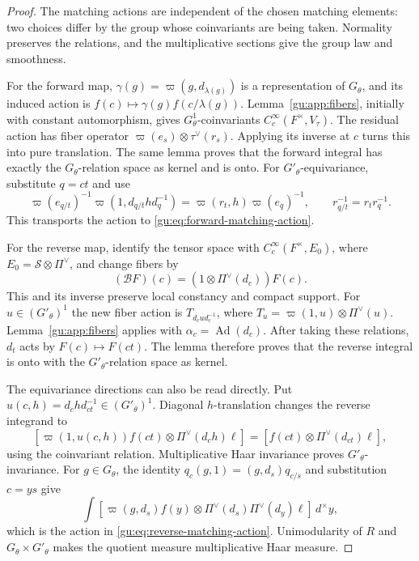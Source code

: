 \begin{proof}
The matching actions are independent of the chosen matching elements:
two choices differ by the group whose coinvariants are being taken.
Normality preserves the relations, and the multiplicative sections give
the group law and smoothness.

For the forward map, $\gamma(g)=\varpi(g,d_{\lambda(g)})$ is a
representation of $G_\theta$, and its induced action is
$f(c)\mapsto\gamma(g)f(c/\lambda(g))$. Lemma~\ref{gu:app:fibers}, initially
with constant automorphism, gives $G_\theta^1$-coinvariants
$C_c^\infty(F^\times,V_\tau)$. The residual action has fiber operator
$\varpi(e_s)\otimes\tau^\vee(r_s)$. Applying its inverse at $c$
turns this into pure translation. The same lemma proves that the
forward integral has exactly the $G_\theta$-relation space as kernel and is
onto. For $G'_\theta$-equivariance, substitute $q=ct$ and use
\[
 \varpi(e_{q/t})^{-1}\varpi(1,d_{q/t}hd_q^{-1})
 =\varpi(r_t,h)\varpi(e_q)^{-1},\qquad
 r_{q/t}^{-1}=r_t r_q^{-1}.
\]
This transports the action to \eqref{gu:eq:forward-matching-action}.

For the reverse map, identify the tensor space with
$C_c^\infty(F^\times,E_0)$, where $E_0=\mathscr S\otimes\Pi^\vee$,
and change fibers by
\begin{equation}\label{gu:asm:fiber-change}
 (\mathcal BF)(c)=(1\otimes\Pi^\vee(d_c))F(c).
\end{equation}
This and its inverse preserve local constancy and compact support.
For $u\in (G'_\theta)^1$ the new fiber action is
$T_{d_cud_c^{-1}}$, where $T_u=\varpi(1,u)\otimes\Pi^\vee(u)$.
Lemma~\ref{gu:app:fibers} applies with $\alpha_c=\operatorname{Ad}(d_c)$.
After taking these relations, $d_t$ acts by $F(c)\mapsto F(ct)$.
The lemma therefore proves that the reverse integral is onto with
the $G'_\theta$-relation space as kernel.

The equivariance directions can also be read directly. Put
$u(c,h)=d_chd_{ct}^{-1}\in (G'_\theta)^1$. Diagonal $h$-translation changes the
reverse integrand to
\[
 [\varpi(1,u(c,h))f(ct)\otimes\Pi^\vee(d_ch)\ell]
 =[f(ct)\otimes\Pi^\vee(d_{ct})\ell],
\]
using the coinvariant relation. Multiplicative Haar invariance proves
$G'_\theta$-invariance. For $g\in G_\theta$, the identity
$q_c(g,1)=(g,d_s)q_{c/s}$ and substitution $c=ys$ give
\[
 \int[\varpi(g,d_s)f(y)\otimes
             \Pi^\vee(d_s)\Pi^\vee(d_y)\ell]\,d^\times y,
\]
which is the action in \eqref{gu:eq:reverse-matching-action}.
Unimodularity of $R$ and $G_\theta\times G'_\theta$ makes the quotient
measure multiplicative Haar measure.
\end{proof}
